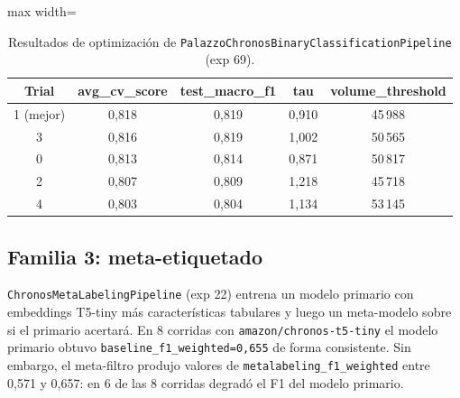\begin{table}[H]
    \centering
    \caption[Resultados predicción directa Chronos]{Resultados de optimización de \texttt{PalazzoChronosBinaryClassificationPipeline} (exp 69).}
    \small
    \begin{adjustbox}{max width=\textwidth}
    \begin{tabular}{c c c c c}
        \toprule
        \textbf{Trial} & \textbf{avg\_cv\_score} & \textbf{test\_macro\_f1} & \textbf{tau} & \textbf{volume\_threshold} \\
        \midrule
        1 (mejor) & 0,818 & 0,819 & 0,910 & 45\,988 \\
        3         & 0,816          & 0,819          & 1,002 & 50\,565 \\
        0         & 0,813          & 0,814          & 0,871 & 50\,817 \\
        2         & 0,807          & 0,809          & 1,218 & 45\,718 \\
        4         & 0,803          & 0,804          & 1,134 & 53\,145 \\
        \bottomrule
    \end{tabular}
    \end{adjustbox}
    \label{tab:chronos_direct}
\end{table}

\subsection{Familia 3: meta-etiquetado}

\texttt{ChronosMetaLabelingPipeline} (exp 22) entrena un modelo primario con embeddings T5-tiny más características tabulares y luego un meta-modelo sobre si el primario acertará. En 8 corridas con \texttt{amazon/chronos-t5-tiny} el modelo primario obtuvo \texttt{baseline\_f1\_weighted=0,655} de forma consistente. Sin embargo, el meta-filtro produjo valores de \texttt{metalabeling\_f1\_weighted} entre 0,571 y 0,657: en 6 de las 8 corridas degradó el F1 del modelo primario.

